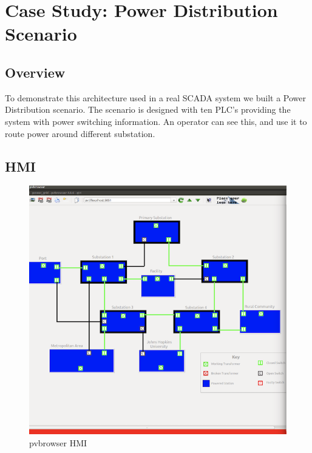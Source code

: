 \documentclass[11pt,a4paper,oldfontcommands]{memoir}
\begin{document}
\chapter{Case Study: Power Distribution Scenario}

\section{Overview}

\indent \indent
To demonstrate this architecture used in a real SCADA system we built a Power Distribution
scenario. The scenario is designed with ten PLC's providing the system with power switching
information. An operator can see this, and use it to route power around different
substation.\\

\section{HMI}
\begin{figure}[ht]
  \begin{center}
  \includegraphics{pvb}
  \caption{pvbrowser HMI}
  \label{fig:5}
  \end{center}
\end{figure}
\end{document}
